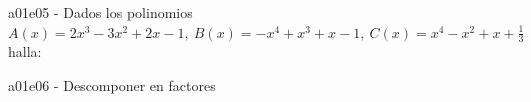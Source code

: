 \documentclass[spanish, 11pt]{exam}
\begin{document}
\begin{questions}
\begin{multicols}{3}
\begin{parts}
        \end{parts}
        \end{multicols}
        \question a01e05 - Dados los polinomios $ A(x)=2{x^3} - 3{x^2} + 2x - 1, \  B(x)=- {x^4} + {x^3} + x - 1, \  C(x)={x^4} - {x^2} + x + \frac{1}{3}$ halla:
        \begin{multicols}{3} 
        \end{multicols}
        \question a01e06 - Descomponer en factores
        \begin{multicols}{2} 

\end{multicols}
\end{questions}
\end{document}
